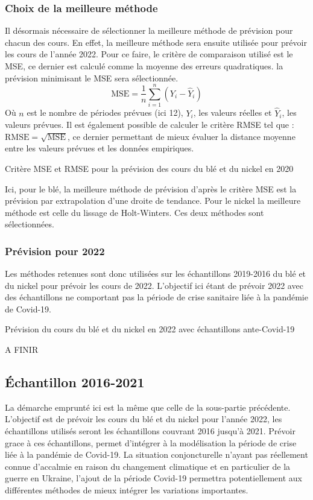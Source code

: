 \subsubsection{Choix de la meilleure méthode}
Il désormais nécessaire de sélectionner la meilleure méthode de prévision pour chacun des cours. En effet, la meilleure méthode sera ensuite utilisée pour prévoir les
cours de l'année 2022. Pour ce faire, le critère de comparaison utilisé est le MSE, ce dernier est calculé comme la moyenne des erreurs quadratiques. la prévision 
minimisant le MSE sera sélectionnée.
\begin{equation*}
    \text{MSE} = \frac{1}{n} \sum_{i=1}^{n} (Y_{i} - \hat{Y}_{i})
\end{equation*}
Où $n$ est le nombre de périodes prévues (ici 12), $Y_{i}$, les valeurs réelles et $\hat{Y}_{i}$, les valeurs prévues. Il est également possible de calculer le critère
RMSE tel que : $\text{RMSE} = \sqrt{\text{MSE}}$, ce dernier permettant de mieux évaluer la distance moyenne entre les valeurs prévues et les données empiriques.
\begin{table}[H]
    \centering
    \caption{Critère MSE et RMSE pour la prévision des cours du blé et du nickel en 2020}
    \sffamily
    
\end{table}
Ici, pour le blé, la meilleure méthode de prévision d'après le critère MSE est la prévision par extrapolation d'une droite de tendance. Pour le nickel la meilleure méthode
est celle du lissage de Holt-Winters. Ces deux méthodes sont sélectionnées.
\subsubsection{Prévision pour 2022}
Les méthodes retenues sont donc utilisées sur les échantillons 2019-2016 du blé et du nickel pour prévoir les cours de 2022. L'objectif ici étant de prévoir 2022 avec des
échantillons ne comportant pas la période de crise sanitaire liée à la pandémie de Covid-19.
\begin{table}[H]
    \centering
    \caption{Prévision du cours du blé et du nickel en 2022 avec échantillons ante-Covid-19 }
    \sffamily
    
\end{table}
A FINIR
\subsection{Échantillon 2016-2021}
La démarche emprunté ici est la même que celle de la sous-partie précédente. L'objectif est de prévoir les cours du blé et du nickel
pour l'année 2022, les échantillons utilisés seront les échantillons couvrant 2016 jusqu'à 2021. Prévoir grace à ces échantillons, permet d'intégrer à la
modélisation la période de crise liée à la pandémie de Covid-19. La situation conjoncturelle n'ayant pas réellement connue d'accalmie en raison du changement climatique et 
en particulier de la guerre en Ukraine, l'ajout de la période Covid-19 permettra potentiellement aux différentes méthodes de mieux intégrer les variations importantes.
